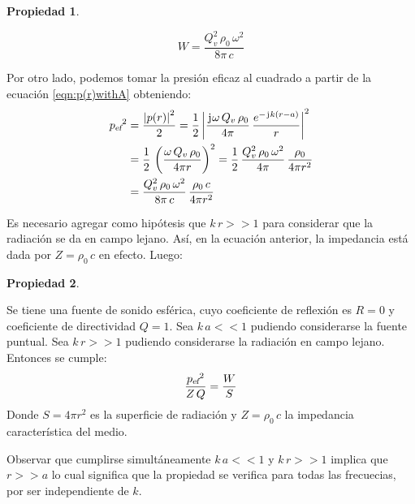 \documentclass[a5paper,12pt,twoside]{book}
\newtheorem{prop}{{Propiedad}}[chapter]
\begin{document}
\begin{mdframed}[style=PropertyFrame]
    \begin{prop}
    \end{prop}
    \begin{equation*}
        W = \frac{Q_v^2 \, \rho_0 \, \omega^2}{8\pi \,c}
    \end{equation*}
\end{mdframed}

Por otro lado, podemos tomar la presión eficaz al cuadrado a partir de la ecuación \ref{eqn:p(r)withA} obteniendo:
\begin{align*}
    {{{p}_\textsl{{ef}}}}^2 &= \frac{{\left| {p(r)} \right|}^2}{2}
    = \frac{1}{2} \, {\left| {\frac{\mkern2mu\mathrm{j}\mkern1mu \omega \, Q_v \, \rho_0 }{4\pi} \, \frac{e^{-\mkern2mu\mathrm{j}\mkern1mu k (r-a)}}{r}} \right|}^2
    \\
    &= \frac{1}{2} \, \left(\frac{\omega \, Q_v \, \rho_0 }{4\pi r}\right)^2
    = \frac{1}{2} \, \frac{Q_v^2 \, \rho_0 \, \omega^2}{4\pi} \, \frac{\rho_0}{4\pi r^2}
    \\
    &= \frac{Q_v^2 \, \rho_0 \, \omega^2}{8\pi \, c} \, \frac{\rho_0 \, c}{4\pi r^2}
\end{align*}

Es necesario agregar como hipótesis que $k\,r>>1$ para considerar que la radiación se da en campo lejano.
Así, en la ecuación anterior, la impedancia está dada por $Z=\rho_0 \, c$ en efecto.
Luego:

\begin{mdframed}[style=PropertyFrame]
    \begin{prop}
        \label{prop:p^2/Z=W/S}
    \end{prop}
    Se tiene una fuente de sonido esférica, cuyo coeficiente de reflexión es $R=0$ y coeficiente de directividad $Q=1$.
    Sea $k\, a<<1$ pudiendo considerarse la fuente puntual.
    Sea $k\,r>>1$ pudiendo considerarse la radiación en campo lejano.
    Entonces se cumple:
    \begin{equation*}
        \frac{{{{p}_\textsl{{ef}}}}^2}{Z\,Q} = \frac{W}{S}
    \end{equation*}
    Donde $S=4\pi r^2$ es la superficie de radiación y $Z=\rho_0 \, c$ la impedancia característica del medio.
\end{mdframed}

Observar que cumplirse simultáneamente $k\, a<<1$ y $k\,r>>1$ implica que $r>>a$ lo cual significa que la propiedad se verifica para todas las frecuecias, por ser independiente de $k$.
\end{document}
